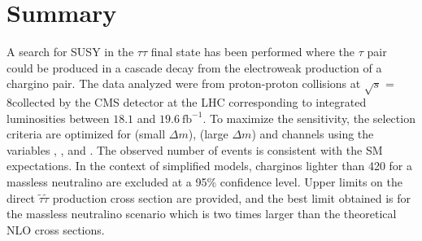 \section{Summary}
\label{sect:conclusion}
A search for SUSY in the $\tau\tau$ final state has been performed where the
$\tau$ pair could be produced in a cascade decay from the electroweak production of a chargino pair.  The data analyzed were from proton-proton collisions
at $\sqrt{s}$ = 8\TeV collected by the CMS detector at the LHC corresponding to integrated luminosities between $18.1$ and $19.6~\mathrm{fb}^{-1}$. 
To maximize the sensitivity, the selection criteria are optimized for \tauTau (small $\Delta m$), 
\tauTau (large $\Delta m$) and \leptonTau channels using the variables \mttwo, \tauMT, and \SumMT.
The observed number of events is consistent with the SM expectations. 
In the context of simplified models, charginos lighter than 420\GeV 
for a massless neutralino are excluded at a 95\% confidence level. 
Upper limits on the direct $\tilde{\tau}\tilde{\tau}$ production cross section are provided, 
and the best limit obtained is for the massless neutralino scenario which is two times
larger than the theoretical NLO cross sections. 

